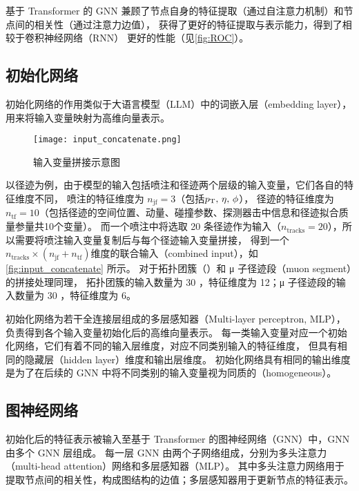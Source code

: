 基于 Transformer 的 GNN 兼顾了节点自身的特征提取（通过自注意力机制）和节点间的相关性（通过注意力边值），
获得了更好的特征提取与表示能力，得到了相较于卷积神经网络（RNN）\cite{ATLAS:2022zhj} 更好的性能（见\autoref{fig:ROC}）。


\subsection{初始化网络}
初始化网络的作用类似于大语言模型（LLM）中的词嵌入层（embedding layer），用来将输入变量映射为高维向量表示。

\begin{figure}[ht]
    \centering
    \texttt{[image: input\_concatenate.png]}
    \caption{输入变量拼接示意图}
    \label{fig:input_concatenate}
\end{figure}

以径迹为例，由于模型的输入包括喷注和径迹两个层级的输入变量，它们各自的特征维度不同，
喷注的特征维度为 $n_\text{jf}=3$（包括$p_{\text{T}} ,\,  \eta,\, \phi$），
径迹的特征维度为 $n_\text{tf}=10$（包括径迹的空间位置、动量、碰撞参数、探测器击中信息和径迹拟合质量参量共10个变量）。
而一个喷注中将选取 20 条径迹作为输入（$n_\text{tracks}=20$），所以需要将喷注输入变量复制后与每个径迹输入变量拼接，
得到一个$n_\text{tracks} \times (n_\text{jf} + n_\text{tf})$维度的联合输入（combined input），如\autoref{fig:input_concatenate} 所示。
对于拓扑团簇（\topo）和 μ 子径迹段（muon segment）的拼接处理同理，
拓扑团簇的输入数量为 30 ，特征维度为 12；μ 子径迹段的输入数量为 30 ，特征维度为 6。

初始化网络为若干全连接层组成的多层感知器（Multi-layer perceptron, MLP），负责得到各个输入变量初始化后的高维向量表示。
每一类输入变量对应一个初始化网络，它们有着不同的输入层维度，对应不同类别输入的特征维度，
但具有相同的隐藏层（hidden layer）维度和输出层维度。
初始化网络具有相同的输出维度是为了在后续的 GNN 中将不同类别的输入变量视为同质的（homogeneous）。


\subsection{图神经网络}
初始化后的特征表示被输入至基于 Transformer 的图神经网络（GNN）中，GNN 由多个 GNN 层组成。
每一层 GNN 由两个子网络组成，分别为多头注意力（multi-head attention）网络和多层感知器（MLP）。
其中多头注意力网络用于提取节点间的相关性，构成图结构的边值；多层感知器用于更新节点的特征表示。

